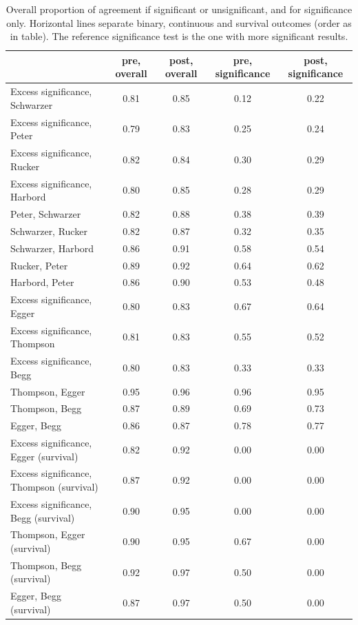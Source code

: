 \begin{table}[ht]
\centering
\begingroup\scriptsize
\begin{tabular}{lcccc}
  & pre, overall & post, overall & pre, significance & post, significance \\ 
  \hline
\hline
Excess significance, Schwarzer & 0.81 & 0.85 & 0.12 & 0.22 \\ 
  Excess significance, Peter & 0.79 & 0.83 & 0.25 & 0.24 \\ 
  Excess significance, Rucker & 0.82 & 0.84 & 0.30 & 0.29 \\ 
  Excess significance, Harbord & 0.80 & 0.85 & 0.28 & 0.29 \\ 
  Peter, Schwarzer & 0.82 & 0.88 & 0.38 & 0.39 \\ 
  Schwarzer, Rucker & 0.82 & 0.87 & 0.32 & 0.35 \\ 
  Schwarzer, Harbord & 0.86 & 0.91 & 0.58 & 0.54 \\ 
  Rucker, Peter & 0.89 & 0.92 & 0.64 & 0.62 \\ 
  Harbord, Peter & 0.86 & 0.90 & 0.53 & 0.48 \\ 
   \hline
Excess significance, Egger & 0.80 & 0.83 & 0.67 & 0.64 \\ 
  Excess significance, Thompson & 0.81 & 0.83 & 0.55 & 0.52 \\ 
  Excess significance, Begg & 0.80 & 0.83 & 0.33 & 0.33 \\ 
  Thompson, Egger & 0.95 & 0.96 & 0.96 & 0.95 \\ 
  Thompson, Begg & 0.87 & 0.89 & 0.69 & 0.73 \\ 
  Egger, Begg & 0.86 & 0.87 & 0.78 & 0.77 \\ 
   \hline
Excess significance, Egger (survival) & 0.82 & 0.92 & 0.00 & 0.00 \\ 
  Excess significance, Thompson (survival) & 0.87 & 0.92 & 0.00 & 0.00 \\ 
  Excess significance, Begg (survival) & 0.90 & 0.95 & 0.00 & 0.00 \\ 
  Thompson, Egger (survival) & 0.90 & 0.95 & 0.67 & 0.00 \\ 
  Thompson, Begg (survival) & 0.92 & 0.97 & 0.50 & 0.00 \\ 
  Egger, Begg (survival) & 0.87 & 0.97 & 0.50 & 0.00 \\ 
   \hline
\end{tabular}
\endgroup
\caption{Overall proportion of agreement if significant or unsignificant, and for significance only. Horizontal lines separate binary, continuous and survival outcomes (order as in table). The reference significance test is the one with more significant results.} 
\label{test.agreement}
\end{table}











